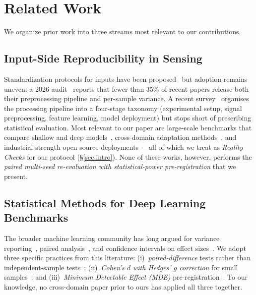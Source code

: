 \documentclass[journal,11pt]{IEEEtran}
\newcommand{\CSI}{\text{CSI}}
\begin{document}
\section{Related Work}
\label{sec:related}

We organize prior work into three streams most relevant to our contributions.

\subsection{Input-Side Reproducibility in \CSI{} Sensing}
Standardization protocols for \CSI{} inputs have been proposed~\cite{zhang2026sdp} but adoption remains uneven: a 2026 audit~\cite{guarino2026} reports that fewer than 35\% of recent \CSI{} papers release both their preprocessing pipeline and per-sample variance. A recent survey~\cite{wang2026survey} organises the \CSI{} processing pipeline into a four-stage taxonomy (experimental setup, signal preprocessing, feature learning, model deployment) but stops short of prescribing statistical evaluation. Most relevant to our paper are large-scale benchmarks that compare shallow and deep models~\cite{yang2023sensefi}, cross-domain adaptation methods~\cite{sterzinger2026datta}, and industrial-strength open-source deployments~\cite{cohen2026ruview}---all of which we treat as \emph{Reality Checks} for our protocol (\S\ref{sec:intro}). None of these works, however, performs the \emph{paired multi-seed re-evaluation with statistical-power pre-registration} that we present.

\subsection{Statistical Methods for Deep Learning Benchmarks}
The broader machine learning community has long argued for variance reporting~\cite{henderson2018, bouthillier2021}, paired analysis~\cite{dror2018, colas2018}, and confidence intervals on effect sizes~\cite{bouthillier2021, dror2018}. We adopt three specific practices from this literature: (i)~\emph{paired-difference} tests rather than independent-sample tests~\cite{colas2018}; (ii)~\emph{Cohen's $d$ with Hedges' $g$ correction} for small samples~\cite{dror2018}; and (iii)~\emph{Minimum Detectable Effect (MDE)} pre-registration~\cite{dror2018, pineau2021}. To our knowledge, no \CSI{} cross-domain paper prior to ours has applied all three together.
\end{document}
